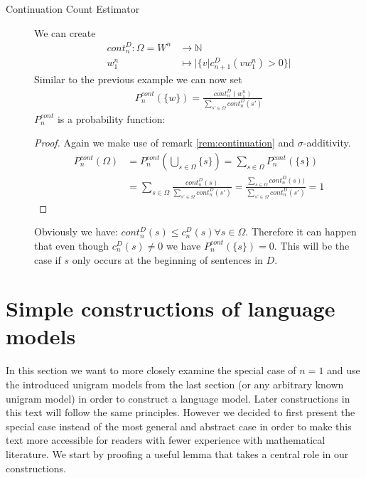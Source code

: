 \documentclass[•]{book}
\begin{document}
\begin{example}
\begin{description}
\item[Continuation Count Estimator] We can create 
\begin{align}
cont_{n}^{D}:  \Omega = W^n & \rightarrow\mathbb{N} \\
w_1^n  & \mapsto |\{v| c_{n+1}^D(vw_1^n) > 0\}|
\end{align}
Similar to the previous example we can now set 
\begin{align}
P_n^{cont}(\{w\}) = \frac{cont_n^D(w_1^n)}{\sum\limits_{s'\in\Omega}cont_n^D(s')}
\end{align}
$P_n^{cont}$ is a probability function:
\begin{proof}
Again we make use of remark \ref{rem:continuation} and $\sigma$-additivity.
\begin{align}
P_n^{cont}(\Omega) & = P_n^{cont}(\bigcup_{s\in\Omega}\{s\}) = \sum_{s\in\Omega}P_n^{cont}(\{s\} )  \\
& =  \sum_{s\in\Omega} \frac{cont_n^D(s)}{\sum\limits_{s'\in \Omega}cont_n^D(s')} = \frac{\sum\limits_{s\in \Omega}cont_n^D(s))}{\sum\limits_{s'\in \Omega}cont_n^D(s')} = 1
\end{align} 
\end{proof}
Obviously we have: $cont_n^D(s) \leq c_n^D(s) \forall s\in \Omega$. Therefore it can happen that even though $c_n^D(s) \neq 0$ we have $P_n^{cont}(\{s\}) = 0$. This will be the case if $s$ only occurs at the beginning of sentences in $D$.
\end{description}
\end{example}

\section{Simple constructions of language models}
In this section we want to more closely examine the special case of $n=1$ and use the introduced unigram models from the last section (or any arbitrary known unigram model) in order to construct a language model. 
Later constructions in this text will follow the same principles. 
However we decided to first present the special case instead of the most general and abstract case in order to make this text more accessible for readers with fewer experience with mathematical literature.
We start by proofing a useful lemma that takes a central role in our constructions. 
\end{document}
